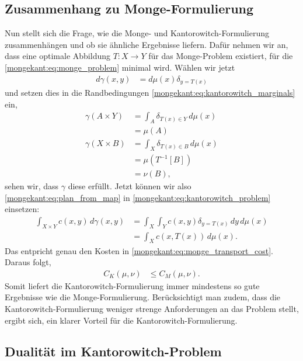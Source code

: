 \subsection{Zusammenhang zu Monge-Formulierung%
\label{mongekant:subsection:monge_kantorowitch_connection}}
Nun stellt sich die Frage,
wie die Monge- und Kantorowitch-Formulierung zusammenhängen und
ob sie ähnliche Ergebnisse liefern.
Dafür nehmen wir an,
dass eine optimale Abbildung $T\colon X \to Y$ für das Monge-Problem existiert,
für die \eqref{mongekant:eq:monge_problem} minimal wird.
Wählen wir jetzt
\begin{align}
d\gamma(x,y)
&=
d\mu(x) \delta_{y=T(x)}
\label{mongekant:eq:plan_from_map}
\end{align}
und setzen dies in die Randbedingungen \eqref{mongekant:eq:kantorowitch_marginals} ein,
\begin{align*}
\gamma(A \times Y)
&=
\int_A \delta_{T(x) \in Y}\, d\mu(x)
\\
&=
\mu(A)
\\
\gamma(X \times B)
&=
\int_X \delta_{T(x) \in B}\, d\mu(x)
\\
&=
\mu\left(T^{-1}[B]\right)
\\
&=
\nu(B)
,
\end{align*}
sehen wir,
dass $\gamma$ diese erfüllt.
Jetzt können wir also \eqref{mongekant:eq:plan_from_map} in \eqref{mongekant:eq:kantorowitch_problem} einsetzen:
\begin{align*}
\int_{X \times Y} c(x,y)\, d\gamma(x,y)
&=
\int_X \int_Y c(x,y) \delta_{y=T(x)}\, dy\, d\mu(x)
\\
&=
\int_X c(x, T(x))\, d\mu(x)
.
\end{align*}
Das entpricht genau den Kosten in \eqref{mongekant:eq:monge_transport_cost}.
Daraus folgt,
\begin{align*}
C_K(\mu, \nu)
&\leq
C_M(\mu, \nu)
.
\end{align*}
Somit liefert die Kantorowitch-Formulierung immer mindestens so gute Ergebnisse
wie die Monge-Formulierung.
Berücksichtigt man zudem,
dass die Kantorowitch-Formulierung weniger strenge Anforderungen an das Problem stellt,
ergibt sich,
ein klarer Vorteil für die Kantorowitch-Formulierung.

\subsection{Dualität im Kantorowitch-Problem%
\label{mongekant:subsection:kantorowitch_duality}}

